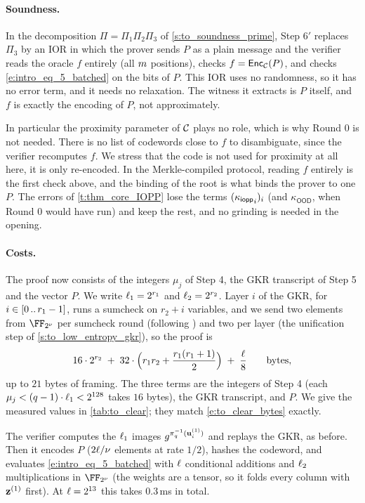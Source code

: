 \documentclass[11pt,letterpaper,usenames,dvipsnames]{article}
\begin{document}
\paragraph{Soundness.} In the decomposition $\Pi=\Pi_1\Pi_2\Pi_3$ of \cref{s:to_soundness_prime}, Step $6'$ replaces $\Pi_3$ by an IOR in which the prover sends $P$ as a plain message and the verifier reads the oracle $f$ entirely (all $m$ positions), checks $f=\mathsf{Enc}_{\mathcal{C}}(P)$, and checks \eqref{e:intro_eq_5_batched} on the bits of $P$. This IOR uses no randomness, so it has no error term, and it needs no relaxation. The witness it extracts is $P$ itself, and $f$ is exactly the encoding of $P$, not approximately.

In particular the proximity parameter of $\mathcal{C}$ plays no role, which is why Round 0 is not needed. There is no list of codewords close to $f$ to disambiguate, since the verifier recomputes $f$. We stress that the code is not used for proximity at all here, it is only re-encoded. In the Merkle-compiled protocol, reading $f$ entirely is the first check above, and the binding of the root is what binds the prover to one $P$. The errors of \cref{t:thm_core_IOPP} lose the terms $({\kappa_{\mathsf{iopp}}}_i)_i$ (and $\kappa_{\mathsf{OOD}}$, when Round 0 would have run) and keep the rest, and no grinding is needed in the opening.

\paragraph{Costs.} The proof now consists of the integers $\mu_j$ of Step 4, the GKR transcript of Step 5 and the vector $P$. We write $\ell_1=2^{r_1}$ and $\ell_2=2^{r_2}$. Layer $i$ of the GKR, for $i\in[0 \, .. \, r_1-1]$, runs a sumcheck on $r_2+i$ variables, and we send two elements from $\comfield$ per sumcheck round (following \cite{gruen}) and two per layer (the unification step of \cref{s:to_low_entropy_gkr}), so the proof is
%
\begin{equation}\label{e:to_clear_bytes}
16\cdot 2^{r_2} \;+\; 32\cdot\Bigl(r_1 r_2+\frac{r_1(r_1+1)}{2}\Bigr)\;+\;\frac{\ell}{8} \qquad \text{bytes},
\end{equation}
%
up to $21$ bytes of framing. The three terms are the integers of Step 4 (each $\mu_j<(q-1)\cdot\ell_1<2^{128}$ takes $16$ bytes), the GKR transcript, and $P$. We give the measured values in \cref{tab:to_clear}; they match \eqref{e:to_clear_bytes} exactly.

The verifier computes the $\ell_1$ images $g^{\pi_q^{-1}(\mathbf{u}_i^{(1)})}$ and replays the GKR, as before. Then it encodes $P$ ($2\ell/\nu$ elements at rate $1/2$), hashes the codeword, and evaluates \eqref{e:intro_eq_5_batched} with $\ell$ conditional additions and $\ell_2$ multiplications in $\comfield$ (the weights are a tensor, so it folds every column with $\mathbf{z}^{(1)}$ first). At $\ell=2^{13}$ this takes $0.3$\,ms in total.
\end{document}
